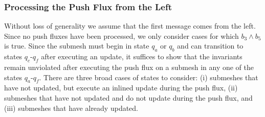 \subsubsection{Processing the Push Flux from the Left}
Without loss of generality we assume that the first message comes from the left. Since no push fluxes have been processed, we only consider cases for which $b_3 \land b_5$ is true. Since the submesh must begin in state $q_a$ or $q_b$ and can transition to states $q_c$-$q_f$ after executing an update, it suffices to show that the invariants remain unviolated after executing the push flux on a submesh in any one of the states $q_a$-$q_f$. %
There are three broad cases of states to consider: (i) submeshes that have not updated, but execute an inlined update during the push flux, (ii) submeshes that have not updated and do not update during the push flux, and (iii) submeshes that have already updated.

